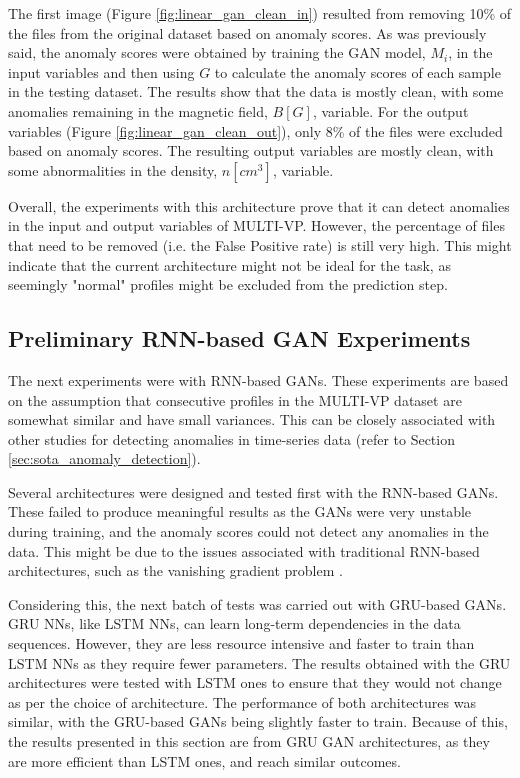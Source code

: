 The first image (Figure \ref{fig:linear_gan_clean_in}) resulted from removing 10\% of the files from the original dataset based on anomaly scores. As was previously said, the anomaly scores were obtained by training the GAN model, $M_i$, in the input variables and then using $G$ to calculate the anomaly scores of each sample in the testing dataset. The results show that the data is mostly clean, with some anomalies remaining in the magnetic field, $B [G]$, variable. For the output variables (Figure \ref{fig:linear_gan_clean_out}), only 8\% of the files were excluded based on anomaly scores. The resulting output variables are mostly clean, with some abnormalities in the density, $n [cm^3]$, variable.

Overall, the experiments with this architecture prove that it can detect anomalies in the input and output variables of MULTI-VP. However, the percentage of files that need to be removed (i.e. the False Positive rate) is still very high. This might indicate that the current architecture might not be ideal for the task, as seemingly "normal" profiles might be excluded from the prediction step.


\subsection{Preliminary RNN-based GAN Experiments}\label{sec:gan_experiment_lstm}
The next experiments were with RNN-based GANs. These experiments are based on the assumption that consecutive profiles in the MULTI-VP dataset are somewhat similar and have small variances. This can be closely associated with other studies for detecting anomalies in time-series data (refer to Section \ref{sec:sota_anomaly_detection}). 

Several architectures were designed and tested first with the RNN-based GANs. These failed to produce meaningful results as the GANs were very unstable during training, and the anomaly scores could not detect any anomalies in the data. This might be due to the issues associated with traditional RNN-based architectures, such as the vanishing gradient problem \cite{Schmidt_RecurrentNeuralNetworks_2019}.

Considering this, the next batch of tests was carried out with GRU-based GANs. GRU NNs, like LSTM NNs, can learn long-term dependencies in the data sequences. However, they are less resource intensive and faster to train than LSTM NNs as they require fewer parameters. The results obtained with the GRU architectures were tested with LSTM ones to ensure that they would not change as per the choice of architecture. The performance of both architectures was similar, with the GRU-based GANs being slightly faster to train. Because of this, the results presented in this section are from GRU GAN architectures, as they are more efficient than LSTM ones, and reach similar outcomes.

